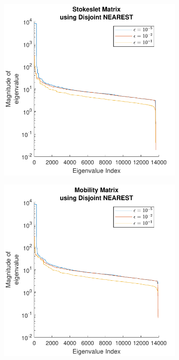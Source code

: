 \begin{figure}
\begin{subfigure}{0.45\textwidth}
    \end{subfigure}
    \begin{subfigure}{0.45\textwidth}
        \centering
        \includegraphics[width=\linewidth]{Images/Condition/Eigen-Stokeslet Matrix using Disjoint NEAREST.pdf}
    \end{subfigure}
    \hfill
    \begin{subfigure}{0.45\textwidth}
        \centering
        \includegraphics[width=\linewidth]{Images/Condition/Eigen-Mobility Matrix using Disjoint NEAREST.pdf}
    \end{subfigure}
\end{figure}

